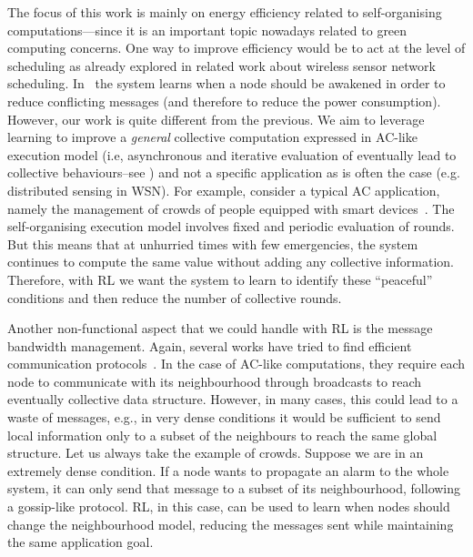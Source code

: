 {The focus of this work is mainly on energy efficiency 
 related to self-organising computations---since it is an important topic nowadays related to green computing concerns.
One way to improve efficiency would be to act at the level of scheduling
 as already explored in related work about wireless sensor network scheduling.
 In~\cite{DBLP:journals/automatica/IwakiWWSJ21,DBLP:journals/ijcnds/MihaylovBTN12} the system learns 
 when a node should be awakened in order to reduce conflicting messages 
 (and therefore to reduce the power consumption). 
However, our work is quite different from the previous. 
 We aim to leverage learning to improve a \emph{general} collective computation 
 expressed in \ac{AC}-like execution model 
 (i.e, asynchronous and iterative evaluation of  eventually lead to collective behaviours--see )
 and not a specific application as is often the case (e.g. distributed sensing in WSN).
For example, consider a typical AC application, 
 namely the management of crowds of people equipped with smart devices~\cite{DBLP:journals/computer/BealPV15}. 
 The self-organising execution model involves fixed and periodic evaluation of rounds. 
 But this means that at unhurried times with few emergencies, 
 the system continues to compute the same value without adding any collective information. 
Therefore, with \ac{RL} we want the system to learn 
 to identify these ``peaceful'' conditions 
 and then reduce the number of collective rounds.

Another non-functional aspect that we could handle with 
 \ac{RL} is the message bandwidth management. 
Again, several works have tried to find efficient communication protocols~\cite{DBLP:conf/nips/ZhangZL19, su2019cooperative}.
In the case of AC-like computations, they require each node to communicate 
 with its neighbourhood through broadcasts to reach eventually 
 collective data structure. 
 However, in many cases, this could lead to a waste of messages, 
 e.g., in very dense conditions it would be sufficient to send local information 
 only to a subset of the neighbours to reach the same global structure.
Let us always take the example of crowds. 
Suppose we are in an extremely dense condition. 
If a node wants to propagate an alarm to the whole system, 
 it can only send that message to a subset of its neighbourhood, 
 following a gossip-like protocol. 
\ac{RL}, in this case, can be used to learn when nodes should change 
 the neighbourhood model, reducing the messages sent 
 while maintaining the same application goal.
}
